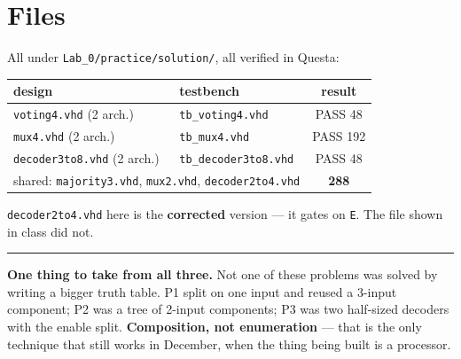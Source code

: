\documentclass[11pt]{article}
\newcommand{\code}[1]{\texttt{#1}}
\newcommand{\hr}{\vspace{2pt}\hrule\vspace{6pt}}
\begin{document}
\section*{Files}

All under \code{Lab\_0/practice/solution/}, all verified in Questa:

\begin{center}
\begin{tabular}{llc}
\toprule
design & testbench & result \\
\midrule
\code{voting4.vhd} (2 arch.) & \code{tb\_voting4.vhd} & PASS 48 \\
\code{mux4.vhd} (2 arch.) & \code{tb\_mux4.vhd} & PASS 192 \\
\code{decoder3to8.vhd} (2 arch.) & \code{tb\_decoder3to8.vhd} & PASS 48 \\
\midrule
\multicolumn{2}{l}{shared: \code{majority3.vhd}, \code{mux2.vhd}, \code{decoder2to4.vhd}} & \textbf{288} \\
\bottomrule
\end{tabular}
\end{center}

\code{decoder2to4.vhd} here is the \textbf{corrected} version --- it gates on
\code{E}. The file shown in class did not.

\vspace{6pt}
\hr
{\small \textbf{One thing to take from all three.} Not one of these problems was
solved by writing a bigger truth table. P1 split on one input and reused a
3-input component; P2 was a tree of 2-input components; P3 was two half-sized
decoders with the enable split. \textbf{Composition, not enumeration} --- that is
the only technique that still works in December, when the thing being built is a
processor.}
\end{document}
